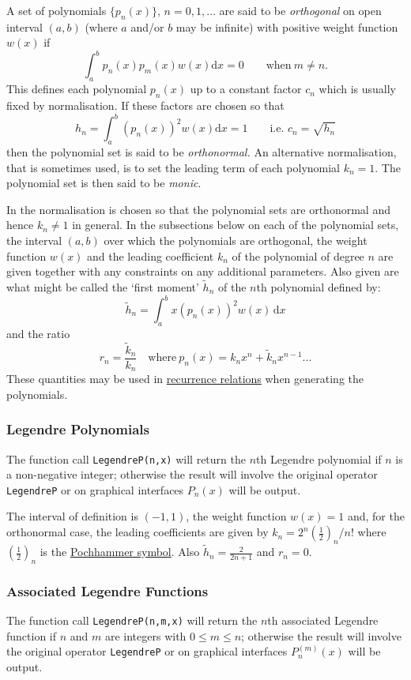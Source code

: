A set of polynomials $\{p_n(x)\},\, n=0,1,\ldots$
are said to be \emph{orthogonal} on open interval $(a, b)$
(where $a$ and/or $b$ may be infinite) with positive weight function $w(x)$ if
\[\int_a^b p_n(x)p_m(x)w(x) \mathrm{d}x = 0 \qquad \mbox{when}\ m \neq n.\]
This defines each polynomial $p_n(x)$ up to a constant factor $c_n$ which is
usually fixed by normalisation. If these factors are chosen so that
\[h_n=\int_a^b (p_n(x))^2 w(x) \mathrm{d}x = 1\qquad\mbox{i.e.\ }
c_n=\sqrt{h_n}\]
then the polynomial set is said to be \emph{orthonormal.}
An alternative normalisation, that is sometimes used, is to set the leading term
of each polynomial $k_n = 1$. The polynomial set is then said to be
\emph{monic}.

In \REDUCE the normalisation is chosen so that the polynomial
sets are orthonormal and hence $k_n \neq 1$ in general. In the subsections below
on each of the polynomial sets, the interval $(a,b)$ over which the polynomials
are orthogonal, the weight function $w(x)$ and the leading coefficient $k_n$ of
the polynomial of degree $n$ are given together with any constraints on any
additional parameters. Also given are what might be called the `first moment'
$\tilde{h}_n$ of the $n$th polynomial defined by:
\[\tilde{h}_n = \int_a^b x  (p_n(x))^2 w(x) \,\mathrm{d}x\]
and the ratio
\[r_n = \frac{\tilde{k}_n}{k_n}\quad\mbox{where}\ p_n(x) =
k_n x^n + \tilde{k}_n x^{n-1} \ldots\]
These quantities may be used in \href{https://dlmf.nist.gov/18.2#iv}
{recurrence relations} when generating the polynomials.

\subsubsection{Legendre Polynomials}
\hypertarget{LEGENDREP}{}
The function call \texttt{LegendreP(n,x)} will return the $n$th Legendre
polynomial if $n$ is a non-negative integer; otherwise the result will involve
the original operator \texttt{LegendreP} or on graphical interfaces $P_n(x)$
will be output.

The interval of definition is $(-1, 1)$, the weight function $w(x)=1$ and,
for the orthonormal case, the leading coefficients are given by
$k_n=2^n (\frac{1}{2})_n/n!$ where $(\frac{1}{2})_n$ is the
\hyperlink{POCH}{Pochhammer symbol}.
Also $\tilde{h}_n = \frac{2}{2 n +1}$ and $r_n =0$.

\subsubsection{Associated Legendre Functions}
The function call \texttt{LegendreP(n,m,x)} will return the $n$th associated
Legendre function if $n$ and $m$ are integers with $0 \leq m \leq n$;
otherwise the result will involve the original operator \texttt{LegendreP} or
on graphical interfaces $P_n^{(m)}(x)$ will be output.

